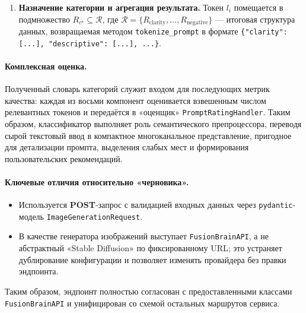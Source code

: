 \begin{enumerate}[label=\arabic*]
\begin{equation}
\[        \]  
      \end{equation}
        Максимальное значение
              \begin{equation}  
        \(S_{\text{max}}(l_i)=\max_{c,j}S(l_i,k_{c,j})\)
              \end{equation}
        определяет категорию \(c^\star\) с наибольшей
        семантической связанностью.
  \item \textbf{Назначение категории и агрегация результата.}  
        Токен \(l_i\) помещается в подмножество
        \(R_{c^\star}\subseteq\mathcal{R}\), где
        \(\mathcal{R}=\{R_{\text{clarity}},\ldots,R_{\text{negative}}\}\) —
        итоговая структура данных, возвращаемая методом
        \verb|tokenize_prompt| в формате  
        \verb|{"clarity": [...], "descriptive": [...], ...}|.
\end{enumerate}

\paragraph{Комплексная оценка.}
Полученный словарь категорий служит входом для последующих
метрик качества: каждая из восьми компонент оценивается
взвешенным числом релевантных токенов и
передаётся в «оценщик» \verb|PromptRatingHandler|.
Таким образом, классификатор выполняет роль
семантического препроцессора, переводя
сырой текстовый ввод в компактное многоканальное
представление, пригодное для детализации промпта,
выделения слабых мест и формирования
пользовательских рекомендаций.

\paragraph{Ключевые отличия относительно «черновика».}
\begin{itemize}
  \item Используется \textbf{POST}-запрос с валидацией входных данных через
        \verb|pydantic|-модель \verb|ImageGenerationRequest|.
  \item В качестве генератора изображений выступает \texttt{FusionBrainAPI},
        а не абстрактный «Stable Diffusion» по фиксированному URL; это устраняет
        дублирование конфигурации и позволяет изменять провайдера без правки
        эндпоинта.
\end{itemize}

Таким образом, эндпоинт полностью согласован с предоставленными классами
\texttt{FusionBrainAPI} и унифицирован со схемой остальных маршрутов сервиса.

